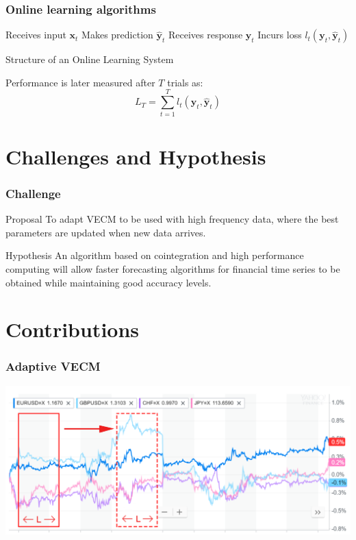 \documentclass{beamer}
\begin{document}
\begin{frame}
\frametitle{Online learning algorithms}
\begin{algorithm}[H]
\begin{algorithmic}[1]
    \STATE Receives input $\mathbf{x}_t$
    \STATE Makes prediction $\mathbf{\hat{y}}_t$
    \STATE Receives response $\mathbf{y}_t$
    \STATE Incurs loss $l_t(\mathbf{y}_t,\mathbf{\hat{y}}_t)$
\end{algorithmic}
\caption{Structure of an Online Learning System}
\end{algorithm}
Performance is later measured after $T$ trials as:
\begin{equation*}
L_T = \sum_{t=1}^T l_t(\mathbf{y}_t,\mathbf{\hat{y}}_t)
\end{equation*}
\end{frame}


\section{Challenges and Hypothesis}
\begin{frame}
\frametitle{Challenge}
\begin{block}{Proposal}
To adapt VECM to be used with high frequency data, where the best parameters are updated when new data arrives.
\end{block}
\begin{exampleblock}{Hypothesis}
An algorithm based on cointegration and high performance computing will allow faster forecasting
algorithms for financial time series to be obtained while maintaining good accuracy levels.
\end{exampleblock}
\end{frame}

\section{Contributions}
\begin{frame}
\frametitle{Adaptive VECM}
\hspace*{-9mm}
\includegraphics[width=1.15\textwidth]{img/slidingwindow}
\end{frame}
\end{document}
